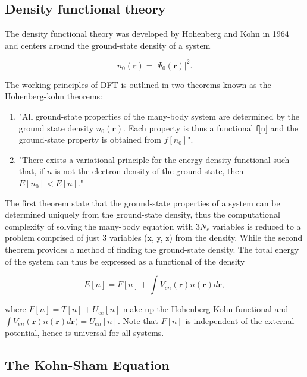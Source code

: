 \subsection{Density functional theory}

The density functional theory was developed by Hohenberg and Kohn in 1964 and centers around the ground-state density of a system

\begin{equation}
    n_0(\boldsymbol{r}) = |\Psi_0(\boldsymbol{r})|^2.  
\end{equation}

The working principles of DFT is outlined in two theorems known as the Hohenberg-kohn theorems:

\begin{enumerate}
\item "All ground-state properties of the many-body system are determined by the ground state density $n_0(\boldsymbol{r})$. Each property is thus a functional f[n] and the ground-state property is obtained from $f[n_0]$". 
\item "There exists a variational principle for the energy density functional such that, if $n$ is not the electron density of the ground-state, then $E[n_0] < E[n]$."
\end{enumerate}

The first theorem state that the ground-state properties of a system can be determined uniquely from the ground-state density, thus the computational complexity of solving the many-body equation with $3N_e$ variables is reduced to a problem comprised of just 3 variables (x, y, z) from the density. While the second theorem provides a method of finding the ground-state density. The total energy of the system can thus be expressed as a functional of the density

\begin{equation}
    E[n] = F[n] + \int V_{en}(\boldsymbol{r})n(\boldsymbol{r})d\boldsymbol{r},
\end{equation}

where $F[n] = T[n] + U_{ee}[n]$ make up the Hohenberg-Kohn functional and $\int V_{en}(\boldsymbol{r})n(\boldsymbol{r})d\boldsymbol{r}) = U_{en}[n]$.
Note that $F[n]$ is independent of the external potential, hence is universal for all systems.  

\subsection{The Kohn-Sham Equation}

